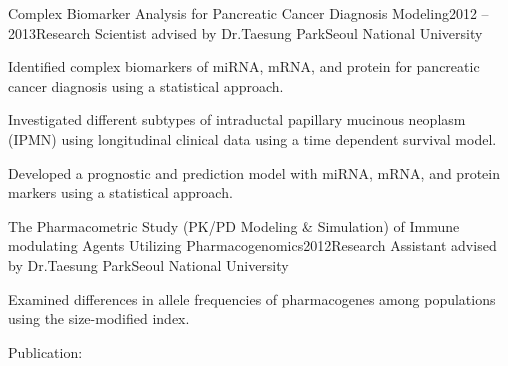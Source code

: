 \documentclass{tidycv} %
\begin{document}
\begin{cvresearches}
\begin{cvresearch}{Complex Biomarker Analysis for Pancreatic Cancer Diagnosis Modeling}{2012 -- 2013}{Research Scientist advised by Dr.\@ Taesung Park}{Seoul National University}
\item Identified complex biomarkers of miRNA, mRNA, and protein for pancreatic cancer diagnosis using a statistical approach.
\item Investigated different subtypes of intraductal papillary mucinous neoplasm (IPMN) using longitudinal clinical data using a time dependent survival model.
\item Developed a prognostic and prediction model with miRNA, mRNA, and protein markers using a statistical approach.
\end{cvresearch}
\begin{cvresearch}{The Pharmacometric Study (PK/PD Modeling \& Simulation) of Immune modulating Agents Utilizing Pharmacogenomics}{2012}{Research Assistant advised by Dr.\@ Taesung Park}{Seoul National University}
 \item Examined differences in allele frequencies of pharmacogenes among populations using the size-modified index.
 \item Publication: \cite{kim2012ethnic}
\end{cvresearch}
\end{cvresearches}

\begin{cvworkings}
\end{cvworkings}
  
\end{document}
